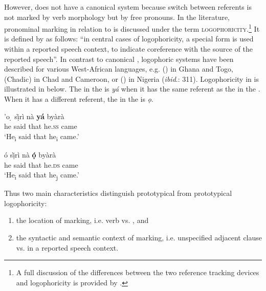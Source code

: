 \documentclass[output=paper
,newtxmath
,modfonts
,nonflat]{langsci/langscibook}
\begin{document}
However,  does not have a canonical  system because switch between referents is not marked by verb morphology but by free pronouns. In the literature, pronominal marking in relation to  is discussed under the term \textsc{logophoricity}.\footnote{A full discussion of the differences between the two reference tracking devices  and logophoricity is provided by \citet[50-56]{Stirling1993}.} It is defined by \citet[1]{Stirling1993} as follows: “in central cases of logophoricity, a special  form is used within a reported speech context, to indicate coreference with the source of the reported speech”. In contrast to canonical , logophoric systems have been described for various West-African languages, e.g.  () in Ghana and Togo,  (Chadic) in Chad and Cameroon, or  () in Nigeria (\textit{ibid}.: 311). Logophoricity in  is illustrated in  below. The   in the  is \textit{yá} when it has the same referent as the  in the . When it has a different referent, the  in the  is \textit{ọ}.

\ea\label{ex:apel:19}
{ \citep[19]{HymanComrie81}}
\ea\label{ex:apel:19a}
\gll  '{o} ̣ s\`ịr\`i   nà  \textbf{yá} byàrà \\
     he said that he.\textsc{ss} came \\
\glt ‘He\textsubscript{i} said that he\textsubscript{i} came.’


\ex\label{ex:apel:19b}
\gll ó sị̀rì  nà  \textbf{ọ́} byàrà\\
     he said that he.\textsc{ds} came \\
\glt ‘He\textsubscript{i} said that he\textsubscript{j} came.’
\z
\z

Thus two main characteristics distinguish prototypical  from prototypical logophoricity: 

\begin{enumerate}
\item the location of marking, i.e. verb vs. , and 

\item the syntactic and semantic context of marking, i.e. unspecified adjacent clause vs.  in a reported speech context.
\end{enumerate}
\end{document}
